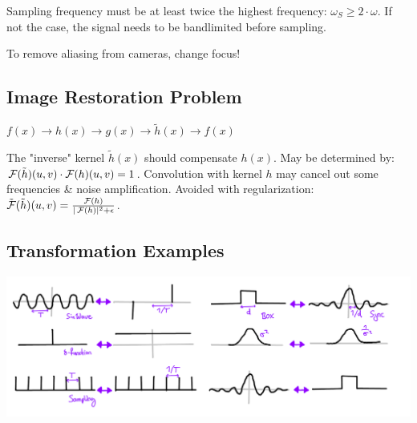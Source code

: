 \begin{algorithm}
  Sampling frequency must be at least twice the highest frequency: \(\omega_S \geq 2 \cdot \omega\). If not the case, the signal needs to be bandlimited before sampling.
\end{algorithm}

\begin{theorem}
  To remove aliasing from cameras, change focus!
\end{theorem}

\subsection{Image Restoration Problem}
\begin{center}
  \(f(x) \to h(x) \to g(x) \to \tilde{h}(x) \to f(x)\)
\end{center}
The "inverse" kernel \(\tilde{h}(x)\) should compensate \(h(x)\). May be determined by: \(\operatorname{\mathcal{F}}(\tilde{h})(u, v) \cdot \operatorname{\mathcal{F}}(h)(u, v) = 1\). Convolution with kernel \(h\) may cancel out some frequencies \& noise amplification. Avoided with regularization: \(\tilde{\operatorname{\mathcal{F}}}(\tilde{h})(u, v) = \frac{\operatorname{\mathcal{F}}(h)}{|\operatorname{\mathcal{F}}(h)|^2 + \epsilon}\).

\subsection{Transformation Examples}
\includegraphics*[width=\linewidth]{assets/fourier-functions.png}
